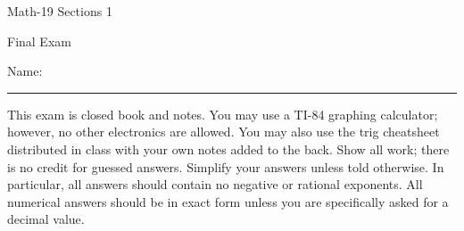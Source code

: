 \documentclass[letterpaper,12pt,fleqn]{article}
\begin{document}
\begin{center}
  \large
  Math-19 Sections 1

  \Large
  Final Exam
\end{center}

\vspace{0.5in}

Name: \rule{4in}{1pt}

\vspace{0.5in}

This exam is closed book and notes. You may use a TI-84 graphing calculator; however, no other electronics are
allowed.  You may also use the trig cheatsheet distributed in class with your own notes added to the back.  Show
all work; there is no credit for guessed answers.  Simplify your answers unless told otherwise.  In particular, all
answers should contain no negative or rational exponents.  All numerical answers should be in exact form unless you
are specifically asked for a decimal value.

\vspace{0.5in}

\begin{center}
\end{center}

\newpage
\end{document}
